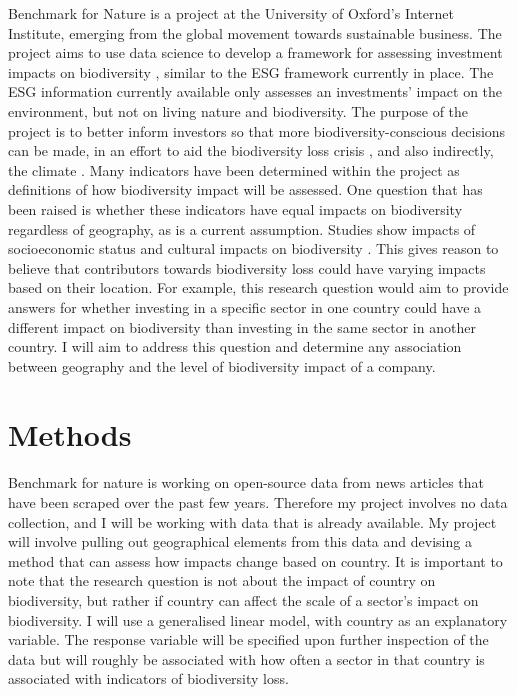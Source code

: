 \documentclass[11pt, a4paper, titlepage]{article}
\begin{document}
   	Benchmark for Nature is a project at the University of Oxford's Internet Institute, emerging from the global movement towards sustainable business. The project aims to use data science to develop a framework for assessing investment impacts on biodiversity \cite{iccs_2020}, similar to the ESG framework currently in place. The ESG information currently available only assesses an investments' impact on the environment, but not on living nature and biodiversity. The purpose of the project is to better inform investors so that more biodiversity-conscious decisions can be made, in an effort to aid the biodiversity loss crisis \cite{gasu2021review}, and also indirectly, the climate \cite{shin2022actions}.
   	\newline
   	\newline
   	Many indicators have been determined within the project as definitions of how biodiversity impact will be assessed. One question that has been raised is whether these indicators have equal impacts on biodiversity regardless of geography, as is a current assumption. Studies show impacts of socioeconomic status and cultural impacts on biodiversity \cite{kinzig2005effects}. This gives reason to believe that contributors towards biodiversity loss could have varying impacts based on their location. For example, this research question would aim to provide answers for whether investing in a specific sector in one country could have a different impact on biodiversity than investing in the same sector in another country. I will aim to address this question and determine any association between geography and the level of biodiversity impact of a company.


    \section*{Methods}

	Benchmark for nature is working on open-source data from news articles that have been scraped over the past few years. Therefore my project involves no data collection, and I will be working with data that is already available.
	\newline
	\newline
	My project will involve pulling out geographical elements from this data and devising a method that can assess how impacts change based on country. It is important to note that the research question is not about the impact of country on biodiversity, but rather if country can affect the scale of a sector's impact on biodiversity. I will use a generalised linear model, with country as an explanatory variable. The response variable will be specified upon further inspection of the data but will roughly be associated with how often a sector in that country is associated with indicators of biodiversity loss. 
	
\end{document}
